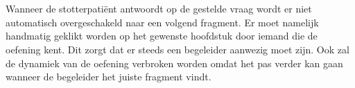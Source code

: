 %

\section{}%
\label{sec:probleemstelling}

Wanneer de stotterpatiënt antwoordt op de gestelde vraag wordt er niet automatisch overgeschakeld naar een volgend fragment. Er moet namelijk handmatig geklikt worden op het gewenste hoofdstuk door iemand die de oefening kent. Dit zorgt dat er steeds een begeleider aanwezig moet zijn. Ook zal de dynamiek van de oefening verbroken worden omdat het pas verder kan gaan wanneer de begeleider het juiste fragment vindt.


\section{}%
\label{sec:onderzoeksvraag}

